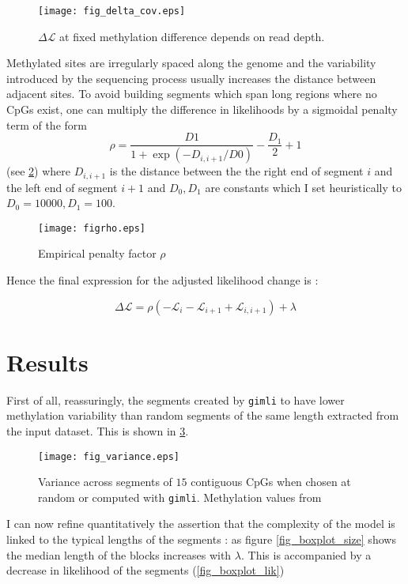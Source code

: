 \documentclass[12pt]{amsart}
\newcommand{\lik}{\ensuremath{\mathcal{L}}}
\newcommand{\gimli}{\texttt{gimli}}
\begin{document}
\begin{figure}\label{fig_delta_cov}
\texttt{[image: fig\_delta\_cov.eps]}
\caption{$\Delta  \lik$ at fixed methylation difference depends on read depth.}
\end{figure}

Methylated sites are irregularly spaced along the genome and the variability 
introduced by the sequencing process usually increases the distance 
between adjacent sites.
To avoid building segments which span long regions where no CpGs exist, one 
can multiply the difference in likelihoods by a sigmoidal penalty term of the
form \[\rho=\frac{D1}{1+\exp(-D_{i,i+1}/D0)}-\frac{D_1}{2}+1\] (see \ref{figrho}) 
where $D_{i,i+1}$ is the distance 
between the the right end of segment $i$ and the left end of segment $i+1$ and 
$D_0,D_1$ are constants which  I set heuristically to  $D_0=10000,D_1=100$. 

\begin{figure}\label{figrho}
\texttt{[image: figrho.eps]}
\caption{Empirical penalty factor $\rho$}
\end{figure}

Hence the final expression for the adjusted likelihood change is :

\begin{equation}
\Delta \lik = \rho ( -\mathcal{L}_i-\mathcal{L}_{i+1}+\mathcal{L}_{i,i+1} )  +\lambda
\end{equation}

\section{Results}

First of all, reassuringly, the segments created by \gimli{} to have lower methylation
variability than random segments of the same length extracted from the input dataset. 
This is shown in \ref{fig_variance}.

\begin{figure}\label{fig_variance}
\texttt{[image: fig\_variance.eps]}
\caption{Variance across segments of $15$ contiguous CpGs when chosen at random or 
computed with \gimli{}. Methylation values from }
\end{figure}

I can now refine quantitatively the assertion that the complexity of the model
is linked to the typical lengths of the segments : as figure \ref{fig_boxplot_size} 
shows the median length of the blocks increases with $\lambda$. This is 
accompanied by a decrease in likelihood of the segments (\ref{fig_boxplot_lik})
\end{document}
